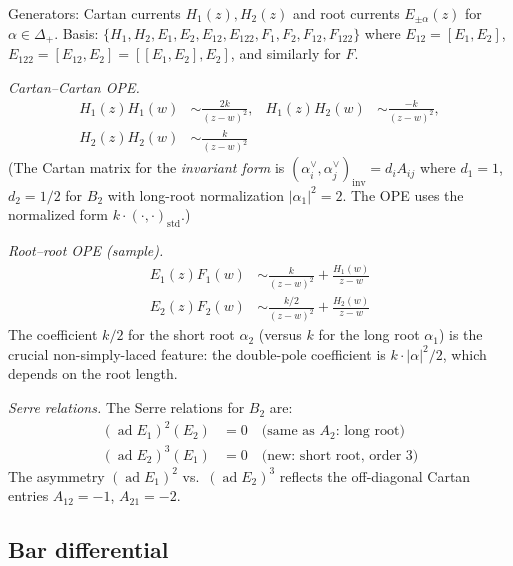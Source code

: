\begin{computation}
Generators: Cartan currents $H_1(z), H_2(z)$ and root currents
$E_{\pm\alpha}(z)$ for $\alpha \in \Delta_+$. Basis:
$\{H_1, H_2, E_1, E_2, E_{12}, E_{122}, F_1, F_2, F_{12}, F_{122}\}$
where $E_{12} = [E_1, E_2]$, $E_{122} = [E_{12}, E_2] = [[E_1, E_2], E_2]$,
and similarly for $F$.

\emph{Cartan--Cartan OPE.}
\begin{align*}
H_1(z) H_1(w) &\sim \frac{2k}{(z-w)^2}, &
H_1(z) H_2(w) &\sim \frac{-k}{(z-w)^2}, \\
H_2(z) H_2(w) &\sim \frac{k}{(z-w)^2} &
\end{align*}
(The Cartan matrix for the \emph{invariant form} is
$(\alpha_i^\vee, \alpha_j^\vee)_{\mathrm{inv}} = d_i A_{ij}$ where
$d_1 = 1$, $d_2 = 1/2$ for $B_2$ with long-root normalization
$|\alpha_1|^2 = 2$. The OPE uses the normalized form
$k \cdot (\cdot, \cdot)_{\mathrm{std}}$.)

\emph{Root--root OPE (sample).}
\begin{align*}
E_1(z) F_1(w) &\sim \frac{k}{(z-w)^2} + \frac{H_1(w)}{z-w} \\
E_2(z) F_2(w) &\sim \frac{k/2}{(z-w)^2} + \frac{H_2(w)}{z-w}
\end{align*}
The coefficient $k/2$ for the short root $\alpha_2$ (versus $k$ for the
long root $\alpha_1$) is the crucial non-simply-laced feature: the
double-pole coefficient is $k \cdot |\alpha|^2/2$, which depends on
the root length.

\emph{Serre relations.}
The Serre relations for $B_2$ are:
\begin{align}
(\operatorname{ad} E_1)^2(E_2) &= 0
\quad\text{(same as $A_2$: long root)} \label{eq:serre-B2-1} \\
(\operatorname{ad} E_2)^3(E_1) &= 0
\quad\text{(new: short root, order 3)} \label{eq:serre-B2-2}
\end{align}
The asymmetry $(\operatorname{ad} E_1)^2$ vs.\
$(\operatorname{ad} E_2)^3$ reflects the off-diagonal Cartan entries
$A_{12} = -1$, $A_{21} = -2$.
\end{computation}

\subsection{Bar differential}


